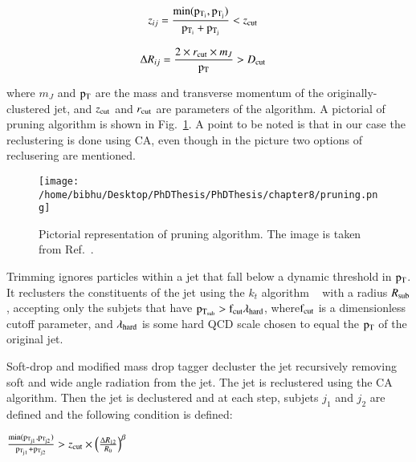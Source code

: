 \begin{align}
z_{ij} & = \frac{ {\rm min}(\rm p_{T_{i}},  p_{T_{j}})} {\rm p_{T_{i}} + p_{T_{j}}} < z_{\rm cut} 
\label{eq:Rij1}
\end{align}

\begin{align}
\Delta R_{ij} & = \frac{2 \times r_{\rm cut} \times m_J}{\rm p_{T}} > D_{\rm cut}
\label{eq:Rij2}
\end{align}

where $m_J$ and $\rm p_{T}$ are the mass and transverse momentum of the originally-clustered jet, and $z_{\rm cut}$ and $r_{\rm cut}$ are parameters of the algorithm. A pictorial of pruning algorithm is shown in Fig.~\ref{fig:pruning_picture}. A point to be noted is that in our case the reclustering is done using CA, even though in the picture two options of reclusering are mentioned.

\begin{figure}[h]
\centering
\texttt{[image: /home/bibhu/Desktop/PhDThesis/PhDThesis/chapter8/pruning.png]}
\caption{Pictorial representation of pruning algorithm. The image is taken from Ref.~\cite{PruningPic}.}
\label{fig:pruning_picture}
\end{figure}


Trimming ignores particles within a jet that fall below a dynamic threshold in $\rm p_{T}$. 
It reclusters the constituents of the jet using the $k_{t}$ algorithm ~\cite{ktalgo} with a radius $R_{\rm sub}$, accepting only the subjets that have $\rm p_{T_{sub}} > f_{\rm cut} \lambda_{\rm hard}$, where$\rm f_{\rm cut}$ is a dimensionless cutoff parameter, and $\lambda_{\rm hard}$ is some hard QCD scale chosen to equal the $\rm p_{T}$ of the original jet. 






Soft-drop and modified mass drop tagger decluster the jet recursively removing soft and wide angle radiation from the jet.
The jet is reclustered using the CA algorithm.  Then the jet is declustered and at each step, subjets $j_1$ and $j_2$ are defined and the following condition is defined:

$\frac{{\rm min}(\rm p_{T_{j1}},\rm p_{T_{j2}})}{\rm p_{T_{j1}}+p_{T_{j2}}} > z_{\rm cut} \times \left( \frac{\Delta R_{12}}{R_0} \right)^{\beta}$



